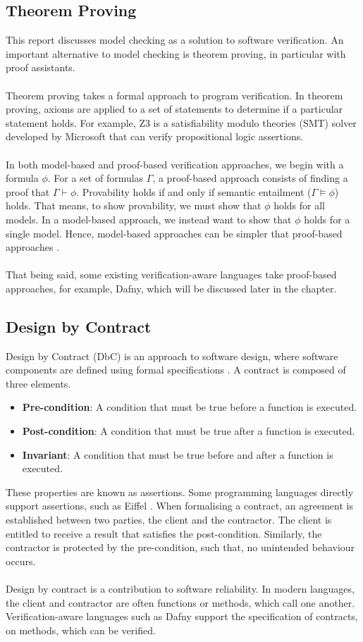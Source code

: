 \subsection{Theorem Proving}
This report discusses model checking as a solution to software verification. An important alternative to model checking is theorem proving, in particular with proof assistants.
\\ \\
Theorem proving takes a formal approach to program verification. In theorem proving, axioms are applied to a set of statements to determine if a particular statement holds. For example, Z3 \cite{z3} is a satisfiability modulo theories (SMT) solver developed by Microsoft that can verify propositional logic assertions.
\\ \\
In both model-based and proof-based verification approaches, we begin with a formula $\phi$. For a set of formulas $\Gamma$, a proof-based approach consists of finding a proof that $\Gamma \vdash \phi$. Provability holds if and only if semantic entailment ($\Gamma \models \phi$) holds. That means, to show provability, we must show that $\phi$ holds for all models. In a model-based approach, we instead want to show that $\phi$ holds for a single model. Hence, model-based approaches can be simpler that proof-based approaches \cite{logic_in_cs}.
\\ \\
That being said, some existing verification-aware languages take proof-based approaches, for example, Dafny, which will be discussed later in the chapter.
\subsection{Design by Contract}
Design by Contract (DbC) is an approach to software design, where software components are defined using formal specifications \cite{dbc}. A contract is composed of three elements.
\begin{itemize}
    \item \textbf{Pre-condition}: A condition that must be true before a function is executed.
    \item \textbf{Post-condition}: A condition that must be true after a function is executed.
    \item \textbf{Invariant}: A condition that must be true before and after a function is executed.
\end{itemize}
These properties are known as assertions. Some programming languages directly support assertions, such as Eiffel \cite{eiffel}. When formalising a contract, an agreement is established between two parties, the client and the contractor. The client is entitled to receive a result that satisfies the post-condition. Similarly, the contractor is protected by the pre-condition, such that, no unintended behaviour occurs.
\\ \\
Design by contract is a contribution to software reliability. In modern languages, the client and contractor are often functions or methods, which call one another. Verification-aware languages such as Dafny \cite{dafny_paper} support the specification of contracts, on methods, which can be verified.
